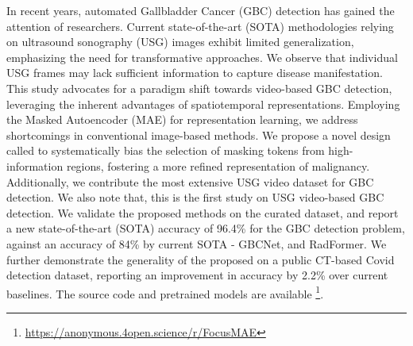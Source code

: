 In recent years, automated Gallbladder Cancer (GBC) detection has gained the attention of researchers. Current state-of-the-art (SOTA) methodologies relying on ultrasound sonography (USG) images exhibit limited generalization, emphasizing the need for transformative approaches. We observe that individual USG frames may lack sufficient information to capture disease manifestation. This study advocates for a paradigm shift towards video-based GBC detection, leveraging the inherent advantages of spatiotemporal representations. Employing the Masked Autoencoder (MAE) for representation learning, we address shortcomings in conventional image-based methods. 
We propose a novel design called \focusmae to systematically bias the selection of masking tokens from high-information regions, fostering a more refined representation of malignancy. Additionally, we contribute the most extensive USG video dataset for GBC detection. We also note that, this is the first study on USG video-based GBC detection. We validate the proposed methods on the curated dataset, and report a new state-of-the-art (SOTA) accuracy of 96.4\% for the GBC detection problem, against an accuracy of 84\% by current SOTA - GBCNet, and RadFormer. We further demonstrate the generality of the proposed \focusmae on a public CT-based Covid detection dataset, reporting an improvement in accuracy by 2.2\% over current baselines. The source code and pretrained models are available \footnote{\href{https://anonymous.4open.science/r/FocusMAE/}{https://anonymous.4open.science/r/FocusMAE}}.
